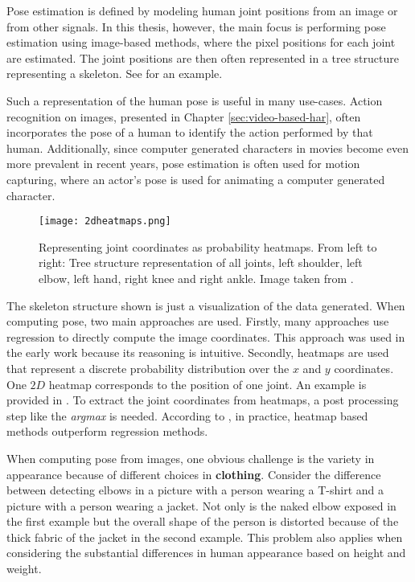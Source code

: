Pose estimation is defined by modeling human joint positions from an image or from other signals.
In this thesis, however, the main focus is performing pose estimation using image-based methods, where the pixel positions for each joint are estimated.
The joint positions are then often represented in a tree structure representing a skeleton.
See  for an example.

Such a representation of the human pose is useful in many use-cases.
Action recognition on images, presented in Chapter \ref{sec:video-based-har}, often incorporates the pose of a human to identify the action performed by that human.
Additionally, since computer generated characters in movies become even more prevalent in recent years, pose estimation is often used for motion capturing, where an actor's pose is used for animating a computer generated character.

\begin{figure}[htb!]
    \centering
    \texttt{[image: 2dheatmaps.png]}
    \caption{Representing joint coordinates as probability heatmaps. From left to right: Tree structure representation of all joints, left shoulder, left elbow, left hand, right knee and right ankle. Image taken from \cite{newell_stacked_2016}.}
    \label{fig:probability-heatmaps}
\end{figure}

The skeleton structure shown is just a visualization of the data generated.
When computing pose, two main approaches are used.
Firstly, many approaches use regression to directly compute the image coordinates.
This approach was used in the early work because its reasoning is intuitive.
Secondly, heatmaps are used that represent a discrete probability distribution over the $x$ and $y$ coordinates.
One $2D$ heatmap corresponds to the position of one joint.
An example is provided in .
To extract the joint coordinates from heatmaps, a post processing step like the \textit{argmax} is needed.
According to \cite{luvizon_2d/3d_2018}, in practice, heatmap based methods outperform regression methods.

When computing pose from images, one obvious challenge is the variety in appearance because of different choices in \textbf{clothing}.
Consider the difference between detecting elbows in a picture with a person wearing a T-shirt and a picture with a person wearing a jacket.
Not only is the naked elbow exposed in the first example but the overall shape of the person is distorted because of the thick fabric of the jacket in the second example.
This problem also applies when considering the substantial differences in human appearance based on height and weight.

